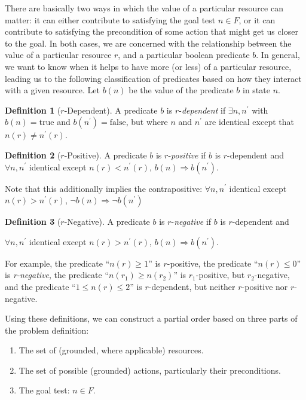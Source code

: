 \documentclass[letterpaper]{article}
\theoremstyle{plain} \newtheorem{theorem}{Theorem} \newtheorem{proposition}{Proposition} \newtheorem{lemma}{Lemma}
\theoremstyle{definition} \newtheorem{definition}{Definition} \newtheorem{conjecture}{Conjecture} \newtheorem*{example}{Example}
\theoremstyle{remark} \newtheorem*{remark}{Remark} \newtheorem*{note}{Note} \newtheorem{case}{Case}
\begin{document}
There are basically two ways in which the value of a particular resource can matter: it can
either contribute to satisfying the goal test $n \in F$, or it can contribute to satisfying
the precondition of some action that might get us closer to the
goal. In both cases, we are
concerned with the relationship between the value of a particular resource $r$, and a
particular boolean predicate $b$. In general, we want to know when it helps to have more (or less) of a particular resource, leading us to the following classification
of predicates based on how they interact with a given resource. Let $b(n)$ be the value of the predicate $b$ in state $n$.
\begin{definition}[$r$-Dependent]
A predicate $b$ is $r$-\textit{dependent} if $\exists n, n^\prime$ with $b(n) = \text{true}$ and $b(n^\prime) = \text{false}$, but where $n$ and $n^\prime$ are identical except that $n(r) \ne n^\prime(r)$.
\end{definition}
\begin{definition}[$r$-Positive]
	A predicate $b$ is $r$-\textit{positive} if $b$ is $r$-dependent and 
	$\forall n, n^\prime$ identical except $n(r) < n^\prime(r)$, $b(n) \Rightarrow b(n^\prime).$
\end{definition}
Note that this additionally implies the contrapositive:
$\forall n, n^\prime$ identical except $n(r) > n^\prime(r)$, $\neg b(n) \Rightarrow \neg b(n^\prime)$
\begin{definition}[$r$-Negative]
	A predicate $b$ is $r$-\textit{negative} if $b$ is $r$-dependent and
	\item $\forall n, n^\prime$ identical except $n(r) > n^\prime(r)$, $b(n) \Rightarrow b(n^\prime).$
\end{definition}
For example, the predicate ``$n(r) \ge 1$'' is $r$-positive, the predicate ``$n(r) \le 0$'' is \textit{r-negative}, the predicate ``$n(r_1) \ge n(r_2)$'' is $r_1$-positive, but $r_2$-negative, and the predicate ``$1 \le n(r) \le 2$'' is $r$-dependent, but neither $r$-positive nor $r$-negative.

Using these definitions, we can construct a partial order based on three parts of the problem definition:
\begin{enumerate}
	\item The set of (grounded, where applicable) resources.
	\item The set of possible (grounded) actions, particularly their preconditions.
	\item The goal test: $n \in F$.
\end{enumerate}
\end{document}
